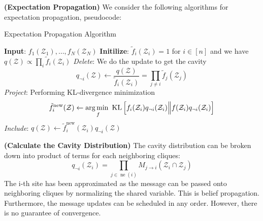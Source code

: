 \begin{definition}{\textbf{(Expectation Propagation)}}
    We consider the following algorithms for expectation propagation, pseudocode:
    \begin{algorithm}[H]
        \caption{Expectation Propagation Algorithm}
        \begin{algorithmic}[1]
            \State \textbf{Input}: $f_1(\mathcal{Z}_1),\dots,f_N(\mathcal{Z}_N)$
            \State \textbf{Initilize}: $\tilde{f}_i(\mathcal{Z}_i) = 1$ for $i\in[n]$ and we have $q(\mathcal{Z}) \propto \prod_i\tilde{f}_i(\mathcal{Z}_i)$
                \State \emph{Delete}: We do the update to get the cavity 
                \begin{equation*}
                    q_{\neg i}(\mathcal{Z}) \leftarrow \frac{q(\mathcal{Z})}{\tilde{f}_i(\mathcal{Z}_i)} = \prod_{j\ne i}\tilde{f}_j(\mathcal{Z}_j)
                \end{equation*}
                \State \emph{Project}: Performing KL-divergence minimization
                \begin{equation*}
                    \tilde{f}^\text{new}_i(\mathcal{Z}) \leftarrow \underset{f}{\arg\min \ } \operatorname{KL}\left[ f_i(\mathcal{Z}_i)q_{\neg i}(\mathcal{Z}_i) \Big\| f(\mathcal{Z}_i)q_{\neg i}(\mathcal{Z}_i)  \right]
                \end{equation*}
                \State \emph{Include}: $q(\mathcal{Z}) \leftarrow \tilde{f}^\text{new}_i(\mathcal{Z}_i)q_{\neg i}(\mathcal{Z})$
            \EndFor
            \EndWhile
        \end{algorithmic} 
    \end{algorithm}
\end{definition}

\begin{remark}{\textbf{(Calculate the Cavity Distribution)}}
    The cavity distribution can be broken down into product of terms for each neighboring cliques:
    \begin{equation*}
        q_{\neg i}(\mathcal{Z}_i) = \prod_{j\in\operatorname{ne}(i)} M_{j\rightarrow i}(\mathcal{Z}_i\cap\mathcal{Z}_j)
    \end{equation*}
    The i-th site has been approximated as the message can be passed onto neighboring cliques by normalizing the shared variable. This is belief propagation. Furthermore, the message updates can be scheduled in any order. However, there is no guarantee of convergence. 
\end{remark}

